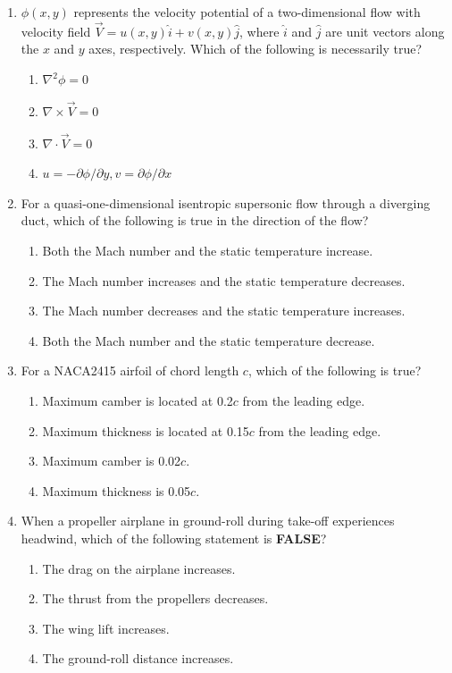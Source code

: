 \documentclass{article}
\begin{document}
\begin{enumerate}[leftmargin=*, resume]
\item \( \phi(x, y) \) represents the velocity potential of a two-dimensional flow with velocity field \( \vec{V} = u(x, y) \hat{i} + v(x, y)\hat{j} \), where \( \hat{i} \) and \( \hat{j} \) are unit vectors along the \( x \) and \( y \) axes, respectively. Which of the following is necessarily true?
\begin{multicols}{2}
\begin{enumerate}
\item \( \nabla^2 \phi = 0 \)
\item \( \nabla \times \vec{V} = 0 \)
\item \( \nabla \cdot \vec{V} = 0 \)
\item \( u = -\partial \phi / \partial y,  v = \partial \phi / \partial x \)
\end{enumerate}
\end{multicols}

\item For a quasi-one-dimensional isentropic supersonic flow through a diverging duct, which of the following is true in the direction of the flow?
\begin{enumerate}
\item Both the Mach number and the static temperature increase.
\item The Mach number increases and the static temperature decreases.
\item The Mach number decreases and the static temperature increases.
\item Both the Mach number and the static temperature decrease.
\end{enumerate}

\item For a NACA2415 airfoil of chord length \( c \), which of the following is true?
\begin{enumerate}
\item Maximum camber is located at 0.2\( c \) from the leading edge.
\item Maximum thickness is located at 0.15\( c \) from the leading edge.
\item Maximum camber is 0.02\( c \).
\item Maximum thickness is 0.05\( c \).
\end{enumerate}

\item When a propeller airplane in ground-roll during take-off experiences headwind, which of the following statement is \textbf{FALSE}?
\begin{multicols}{2}
\begin{enumerate}
    \item The drag on the airplane increases.
    \item The thrust from the propellers decreases.
    \item The wing lift increases.
    \item The ground-roll distance increases.


\end{enumerate}
\end{multicols}
\end{enumerate}
\end{document}
